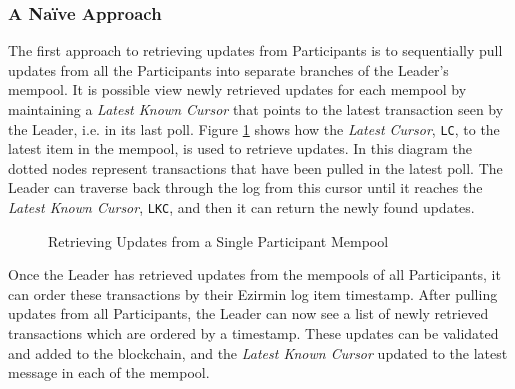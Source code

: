 \documentclass[12pt,a4paper,twoside,openright]{report}
\begin{document}
	\subsubsection*{A Na\"{i}ve Approach}
	The first approach to retrieving updates from Participants is to sequentially pull updates from all the Participants into separate branches of the Leader's mempool.
	It is possible view newly retrieved updates for each mempool by maintaining a \textit{Latest Known Cursor} that points to the latest transaction seen by the Leader, i.e. in its last poll.
	Figure \ref{fig:readmemudpates} shows how the \textit{Latest Cursor}, \texttt{LC}, to the latest item in the mempool, is used to retrieve updates.
	In this diagram the dotted nodes represent transactions that have been pulled in the latest poll.
	The Leader can traverse back through the log from this cursor until it reaches the \textit{Latest Known Cursor}, \texttt{LKC}, and then it can return the newly found updates.\\

	\begin{figure}
		\centering
		\caption{Retrieving Updates from a Single Participant Mempool}
		\label{fig:readmemudpates}
	\end{figure}
	Once the Leader has retrieved updates from the mempools of all Participants, it can order these transactions by their Ezirmin log item timestamp.
	After pulling updates from all Participants, the Leader can now see a list of newly retrieved transactions which are ordered by a timestamp.
	These updates can be validated and added to the blockchain, and the \textit{Latest Known Cursor} updated to the latest message in each of the mempool.\\
\end{document}
